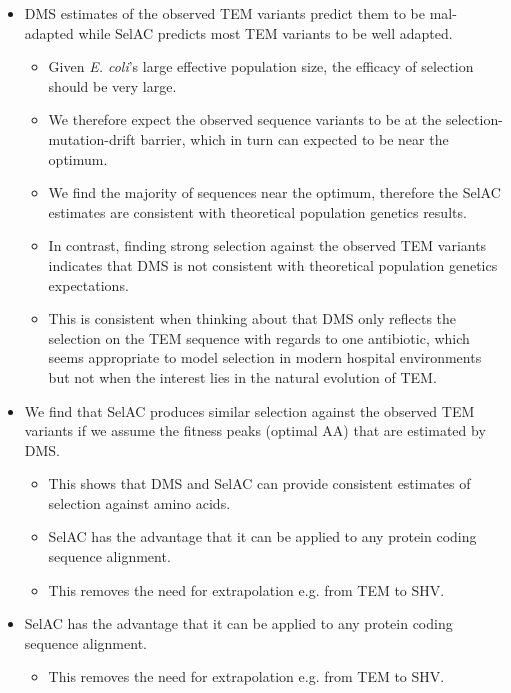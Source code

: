 \documentclass[12pt]{article}
\begin{document}
\begin{itemize}

	\item DMS estimates of the observed TEM variants predict them to be mal-adapted while SelAC predicts most TEM variants to be well adapted.
	\begin{itemize}
		\item Given \textit{E. coli}'s large effective population size, the efficacy of selection should be very large.
		\item We therefore expect the observed sequence variants to be at the selection-mutation-drift barrier, which in turn can expected to be near the optimum.
		\item We find the majority of sequences near the optimum, therefore the SelAC estimates are consistent with theoretical population genetics results.
		\item In contrast, finding strong selection against the observed TEM variants indicates that DMS is not consistent with theoretical population genetics expectations.
		\item This is consistent when thinking about that DMS only reflects the selection on the TEM sequence with regards to one antibiotic, which seems appropriate to model selection in modern hospital environments but not when the interest lies in the natural evolution of TEM.
	\end{itemize}

	\item We find that SelAC produces similar selection against the observed TEM variants  if we assume the fitness peaks (optimal AA) that are estimated by DMS.
	\begin{itemize}
		\item This shows that DMS and SelAC can provide consistent estimates of selection against amino acids.
		\item SelAC has the advantage that it can be applied to any protein coding sequence alignment.
		\item This removes the need for extrapolation e.g. from TEM to SHV.
	\end{itemize}

	\item SelAC has the advantage that it can be applied to any protein coding sequence alignment.
	\begin{itemize}
		\item This removes the need for extrapolation e.g. from TEM to SHV.
	\end{itemize}


\end{itemize}
\end{document}
